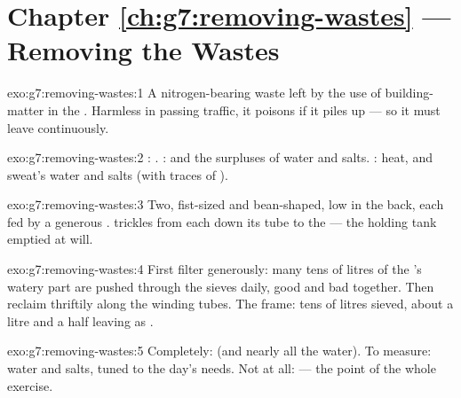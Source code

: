 \section*{Chapter \ref{ch:g7:removing-wastes} --- Removing the Wastes}

\begin{solution}{exo:g7:removing-wastes:1}
A nitrogen-bearing waste left by the use of
building-matter  in the . Harmless in
passing traffic, it poisons if it piles up --- so it must
leave continuously.
\end{solution}

\begin{solution}{exo:g7:removing-wastes:2}
: . :  and the surpluses of
water and salts. : heat, and sweat's water and salts
(with traces of ).
\end{solution}

\begin{solution}{exo:g7:removing-wastes:3}
Two, fist-sized and bean-shaped, low in the back, each fed
by a generous .  trickles from each down its
tube to the  --- the holding tank emptied at will.
\end{solution}

\begin{solution}{exo:g7:removing-wastes:4}
First filter generously: many tens of litres of the
's watery part are pushed through the sieves daily,
good and bad together. Then reclaim thriftily along the
winding tubes. The frame: tens of litres sieved, about a
litre and a half leaving as .
\end{solution}

\begin{solution}{exo:g7:removing-wastes:5}
Completely:  (and nearly all the water). To
measure: water and salts, tuned to the day's needs. Not at
all:  --- the point of the whole exercise.
\end{solution}

